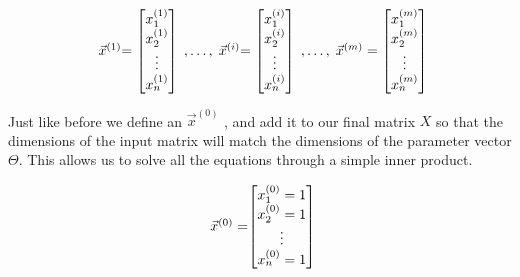 

\[
	\begin{array}{ l@{} l@{} l@{} l@{} l@{}} 
		\vec{x}^{(1)} & = 
		\begin{bmatrix}
			x_{1}^{(1)} \\
			x_{2}^{(1)} \\
			\vdots \\
			x_{n}^{(1)} \\
		\end{bmatrix} 
		\; , \ldots , \; 
		\vec{x}^{(i)} & = 
		\begin{bmatrix}
			x_{1}^{(i)} \\
			x_{2}^{(i)} \\
			\vdots \\
			x_{n}^{(i)} \\
		\end{bmatrix} 
		\; , \ldots , \;
		\vec{x}^{(m)} = 
		\begin{bmatrix}
			x_{1}^{(m)} \\
			x_{2}^{(m)} \\
			\vdots \\
			x_{n}^{(m)} \\
		\end{bmatrix} 
	\end{array}
\]

Just like before we define an $\vec{x}^{(0)}$ , and add it to our final matrix
$X$ so that the dimensions of the input matrix will match the dimensions of the
parameter vector $\Theta$. This allows us to solve all the equations through a
simple inner product.

\[
	\begin{array}{ l@{} l@{} } 
	\vec{x}^{(0)} = &
		\begin{bmatrix}
			x_{1}^{(0)} = 1 \\
			x_{2}^{(0)} = 1 \\
			\vdots \\
			x_{n}^{(0)} = 1 \\
		\end{bmatrix} 
	\end{array}
\]

